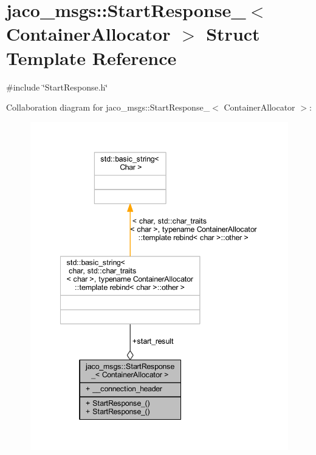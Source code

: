 \hypertarget{structjaco__msgs_1_1StartResponse__}{}\section{jaco\+\_\+msgs\+:\+:Start\+Response\+\_\+$<$ Container\+Allocator $>$ Struct Template Reference}
\label{structjaco__msgs_1_1StartResponse__}


{\ttfamily \#include \char`\"{}Start\+Response.\+h\char`\"{}}



Collaboration diagram for jaco\+\_\+msgs\+:\+:Start\+Response\+\_\+$<$ Container\+Allocator $>$\+:
\nopagebreak
\begin{figure}[H]
\begin{center}
\leavevmode
\includegraphics[width=342pt]{d8/df3/structjaco__msgs_1_1StartResponse____coll__graph}
\end{center}
\end{figure}
